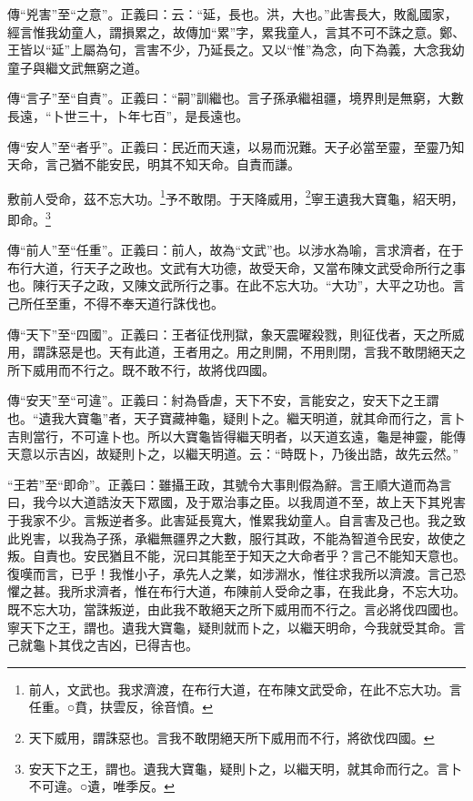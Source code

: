 {\noindent\zhuan{}\fzbyks 傳“兇害”至“之意”。正義曰：云：“延，長也。洪，大也。”此害長大，敗亂國家，經言惟我幼童人，謂損累之，故傳加“累”字，累我童人，言其不可不誅之意。鄭、王皆以“延”上屬為句，言害不少，乃延長之。又以“惟”為念，向下為義，大念我幼童子與繼文武無窮之道。 \par}

{\noindent\zhuan{}\fzbyks 傳“言子”至“自責”。正義曰：“嗣”訓繼也。言子孫承繼祖疆，境界則是無窮，大數長遠，“卜世三十，卜年七百”，是長遠也。 \par}

{\noindent\zhuan{}\fzbyks 傳“安人”至“者乎”。正義曰：民近而天遠，以易而況難。天子必當至靈，至靈乃知天命，言己猶不能安民，明其不知天命。自責而謙。 \par}

敷前人受命，茲不忘大功。\footnote{前人，文武也。我求濟渡，在布行大道，在布陳文武受命，在此不忘大功。言任重。○賁，扶雲反，徐音憤。}予不敢閉。于天降威用，\footnote{天下威用，謂誅惡也。言我不敢閉絕天所下威用而不行，將欲伐四國。}寧王遺我大寶龜，紹天明，即命。\footnote{安天下之王，謂也。遺我大寶龜，疑則卜之，以繼天明，就其命而行之。言卜不可違。○遺，唯季反。}

{\noindent\zhuan{}\fzbyks 傳“前人”至“任重”。正義曰：前人，故為“文武”也。以涉水為喻，言求濟者，在于布行大道，行天子之政也。文武有大功德，故受天命，又當布陳文武受命所行之事也。陳行天子之政，又陳文武所行之事。在此不忘大功。“大功”，大平之功也。言己所任至重，不得不奉天道行誅伐也。 \par}

{\noindent\zhuan{}\fzbyks 傳“天下”至“四國”。正義曰：王者征伐刑獄，象天震曜殺戮，則征伐者，天之所威用，謂誅惡是也。天有此道，王者用之。用之則開，不用則閉，言我不敢閉絕天之所下威用而不行之。既不敢不行，故將伐四國。 \par}

{\noindent\zhuan{}\fzbyks 傳“安天”至“可違”。正義曰：紂為昏虐，天下不安，言能安之，安天下之王謂也。“遺我大寶龜”者，天子寶藏神龜，疑則卜之。繼天明道，就其命而行之，言卜吉則當行，不可違卜也。所以大寶龜皆得繼天明者，以天道玄遠，龜是神靈，能傳天意以示吉凶，故疑則卜之，以繼天明道。云：“時既卜，乃後出誥，故先云然。” \par}

{\noindent\shu{}\fzkt “王若”至“即命”。正義曰：雖攝王政，其號令大事則假為辭。言王順大道而為言曰，我今以大道誥汝天下眾國，及于眾治事之臣。以我周道不至，故上天下其兇害于我家不少。言叛逆者多。此害延長寬大，惟累我幼童人。自言害及己也。我之致此兇害，以我為子孫，承繼無疆界之大數，服行其政，不能為智道令民安，故使之叛。自責也。安民猶且不能，況曰其能至于知天之大命者乎？言己不能知天意也。復嘆而言，已乎！我惟小子，承先人之業，如涉淵水，惟往求我所以濟渡。言己恐懼之甚。我所求濟者，惟在布行大道，布陳前人受命之事，在我此身，不忘大功。既不忘大功，當誅叛逆，由此我不敢絕天之所下威用而不行之。言必將伐四國也。寧天下之王，謂也。遺我大寶龜，疑則就而卜之，以繼天明命，今我就受其命。言己就龜卜其伐之吉凶，已得吉也。 \par}

